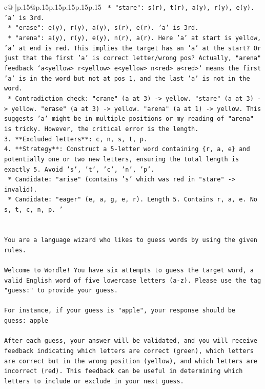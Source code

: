 \documentclass{article}
\begin{document}
{\begin{supertabular}{c@{$\;$}|p{.15\linewidth}@{}p{.15\linewidth}p{.15\linewidth}p{.15\linewidth}p{.15\linewidth}p{.15\linewidth}}
{{{\texttt{    *   "stare": s(r), t(r), a(y), r(y), e(y). 'a' is 3rd.} \\
\texttt{    *   "erase": e(y), r(y), a(y), s(r), e(r). 'a' is 3rd.} \\
\texttt{    *   "arena": a(y), r(y), e(y), n(r), a(r). Here 'a' at start is yellow, 'a' at end is red. This implies the target has an 'a' at the start? Or just that the first 'a' is correct letter/wrong pos? Actually, "arena" feedback `a<yellow> r<yellow> e<yellow> n<red> a<red>` means the first 'a' is in the word but not at pos 1, and the last 'a' is not in the word.} \\
\texttt{    *   Contradiction check: "crane" (a at 3) {-}> yellow. "stare" (a at 3) {-}> yellow. "erase" (a at 3) {-}> yellow. "arena" (a at 1) {-}> yellow. This suggests 'a' might be in multiple positions or my reading of "arena" is tricky. However, the critical error is the length.} \\
\texttt{3.  **Excluded letters**: c, n, s, t, p.} \\
\texttt{4.  **Strategy**: Construct a 5{-}letter word containing \{r, a, e\} and potentially one or two new letters, ensuring the total length is exactly 5. Avoid 's', 't', 'c', 'n', 'p'.} \\
\texttt{    *   Candidate: "arise" (contains 's' which was red in "stare" {-}> invalid).} \\
\texttt{    *   Candidate: "eager" (e, a, g, e, r). Length 5. Contains r, a, e. No s, t, c, n, p. '} \\
\\ 
\\ 
\texttt{You are a language wizard who likes to guess words by using the given rules.} \\
\\ 
\texttt{Welcome to Wordle! You have six attempts to guess the target word, a valid English word of five lowercase letters (a{-}z). Please use the tag "guess:" to provide your guess.} \\
\\ 
\texttt{For instance, if your guess is "apple", your response should be} \\
\texttt{guess: apple} \\
\\ 
\texttt{After each guess, your answer will be validated, and you will receive feedback indicating which letters are correct (green), which letters are correct but in the wrong position (yellow), and which letters are incorrect (red). This feedback can be useful in determining which letters to include or exclude in your next guess.} \\
}}}
\end{supertabular}}
\end{document}
